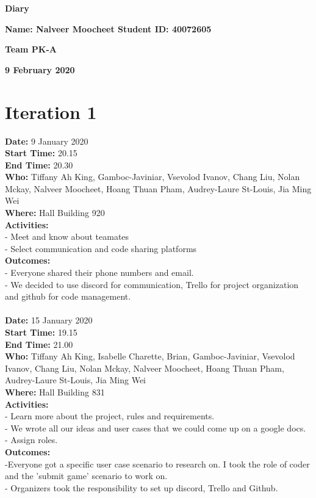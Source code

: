 \documentclass[12pt]{article}
\begin{document}
\vspace*{0.2in}
\centerline{\bf\Large Diary}

\vspace*{0.2in}
\centerline{\bf\Large Name: Nalveer Moocheet
Student ID: 40072605}

\vspace*{0.2in}
\centerline{\bf\Large Team PK-A}

\vspace*{0.2in}
\centerline{\bf\Large 9 February 2020}

\section{Iteration 1}

{\bf Date:} 9 January 2020 \\
{\bf Start Time:} 20.15 \\
{\bf End Time:} 20.30 \\
{\bf Who:} Tiffany Ah King, Gamboc-Javiniar, Vsevolod Ivanov, Chang Liu, Nolan Mckay, Nalveer Moocheet, Hoang Thuan Pham, Audrey-Laure St-Louis, Jia Ming Wei \\
{\bf Where:} Hall Building 920 \\
{\bf Activities:}\\
- Meet and know about teamates\\ - Select communication and code sharing platforms \\
{\bf Outcomes:} \\
- Everyone shared their phone numbers and email. \\
- We decided to use discord for communication, Trello for project organization and github for code management.
\\
\\
{\bf Date:} 15 January 2020 \\
{\bf Start Time:} 19.15 \\
{\bf End Time:} 21.00 \\
{\bf Who:} Tiffany Ah King, Isabelle Charette, Brian, Gamboc-Javiniar, Vsevolod Ivanov, Chang Liu, Nolan Mckay, Nalveer Moocheet, Hoang Thuan Pham, Audrey-Laure St-Louis, Jia Ming Wei \\
{\bf Where:} Hall Building 831 \\
{\bf Activities:}\\
- Learn more about the project, rules and requirements.\\
- We wrote all our ideas and user cases that we could come up on a google docs.\\
- Assign roles.\\ 
{\bf Outcomes:}\\
-Everyone got a specific user case scenario to research on. I took the role of coder and  the 'submit game' scenario to work on. \\
- Organizers took the responsibility to set up discord, Trello and Github.\\
\end{document}
